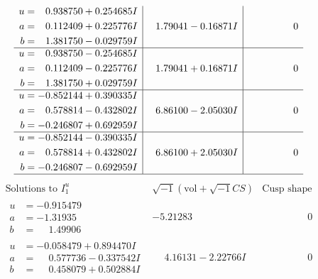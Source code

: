 \documentclass[1p]{elsarticle_modified}
\theoremstyle{definition}
\newcommand{\I}{\sqrt{-1}}
\begin{document}
$$\begin{array}{c|c|c}
\begin{aligned}
u &= \phantom{-}0.938750 + 0.254685 I \\
a &= \phantom{-}0.112409 + 0.225776 I \\
b &= \phantom{-}1.381750 - 0.029759 I\end{aligned}
 & \phantom{-}1.79041 - 0.16871 I & \phantom{-0.000000 } 0 \\ \hline\begin{aligned}
u &= \phantom{-}0.938750 - 0.254685 I \\
a &= \phantom{-}0.112409 - 0.225776 I \\
b &= \phantom{-}1.381750 + 0.029759 I\end{aligned}
 & \phantom{-}1.79041 + 0.16871 I & \phantom{-0.000000 } 0 \\ \hline\begin{aligned}
u &= -0.852144 + 0.390335 I \\
a &= \phantom{-}0.578814 - 0.432802 I \\
b &= -0.246807 + 0.692959 I\end{aligned}
 & \phantom{-}6.86100 - 2.05030 I & \phantom{-0.000000 } 0 \\ \hline\begin{aligned}
u &= -0.852144 - 0.390335 I \\
a &= \phantom{-}0.578814 + 0.432802 I \\
b &= -0.246807 - 0.692959 I\end{aligned}
 & \phantom{-}6.86100 + 2.05030 I & \phantom{-0.000000 } 0\\
 \hline 
 \end{array}$$\newpage$$\begin{array}{c|c|c}  
\text{Solutions to }I^u_{1}& \I (\text{vol} + \sqrt{-1}CS) & \text{Cusp shape}\\
 \hline 
\begin{aligned}
u &= -0.915479\phantom{ +0.000000I} \\
a &= -1.31935\phantom{ +0.000000I} \\
b &= \phantom{-}1.49906\phantom{ +0.000000I}\end{aligned}
 & -5.21283\phantom{ +0.000000I} & \phantom{-0.000000 } 0 \\ \hline\begin{aligned}
u &= -0.058479 + 0.894470 I \\
a &= \phantom{-}0.577736 - 0.337542 I \\
b &= \phantom{-}0.458079 + 0.502884 I\end{aligned}
 & \phantom{-}4.16131 - 2.22766 I & \phantom{-0.000000 } 0 \\ \hline\begin{aligned}

\end{aligned}
\end{array}$$
\end{document}
